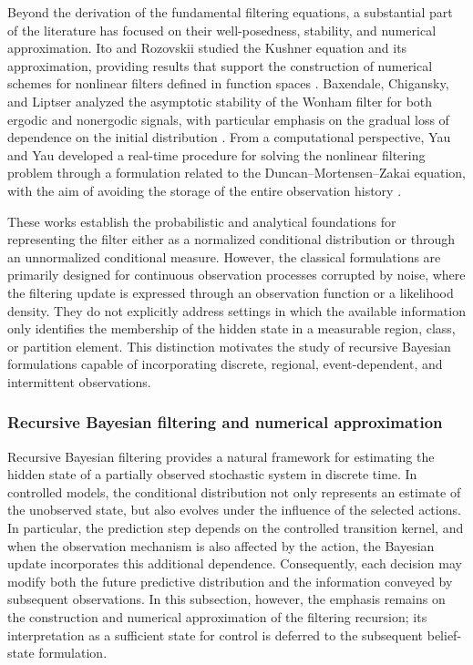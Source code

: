 \documentclass[10pt,twocolumn]{article}
\theoremstyle{remark}
\begin{document}
Beyond the derivation of the fundamental filtering equations, a substantial part of the literature has focused on their well-posedness, stability, and numerical approximation. Ito and Rozovskii studied the Kushner equation and its approximation, providing results that support the construction of numerical schemes for nonlinear filters defined in function spaces \citep{ItoRozovskii2000KushnerEquation}. Baxendale, Chigansky, and Liptser analyzed the asymptotic stability of the Wonham filter for both ergodic and nonergodic signals, with particular emphasis on the gradual loss of dependence on the initial distribution \cite{BaxendaleChiganskyLiptser2004WonhamStability}. From a computational perspective, Yau and Yau developed a real-time procedure for solving the nonlinear filtering problem through a formulation related to the Duncan--Mortensen--Zakai equation, with the aim of avoiding the storage of the entire observation history \citep{YauYau2008RealTimeFiltering}.

These works establish the probabilistic and analytical foundations for representing the filter either as a normalized conditional distribution or through an unnormalized conditional measure. However, the classical formulations are primarily designed for continuous observation processes corrupted by noise, where the filtering update is expressed through an observation function or a likelihood density. They do not explicitly address settings in which the available information only identifies the membership of the hidden state in a measurable region, class, or partition element. This distinction motivates the study of recursive Bayesian formulations capable of incorporating discrete, regional, event-dependent, and intermittent observations.

\subsubsection{Recursive Bayesian filtering and numerical approximation}

Recursive Bayesian filtering provides a natural framework for estimating the hidden state of a partially observed stochastic system in discrete time. In controlled models, the conditional distribution not only represents an estimate of the unobserved state, but also evolves under the influence of the selected actions. In particular, the prediction step depends on the controlled transition kernel, and when the observation mechanism is also affected by the action, the Bayesian update incorporates this additional dependence. Consequently, each decision may modify both the future predictive distribution and the information conveyed by subsequent observations. In this subsection, however, the emphasis remains on the construction and numerical approximation of the filtering recursion; its interpretation as a sufficient state for control is deferred to the subsequent belief-state formulation.
\end{document}
